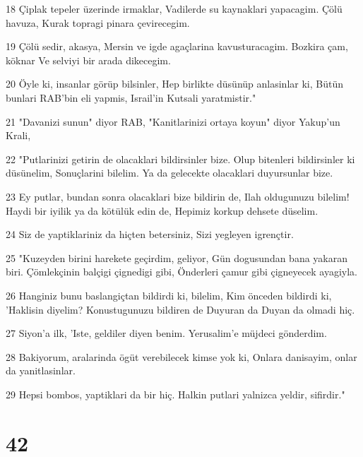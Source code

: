 \par 18 Çiplak tepeler üzerinde irmaklar, Vadilerde su kaynaklari yapacagim. Çölü havuza, Kurak topragi pinara çevirecegim.
\par 19 Çölü sedir, akasya, Mersin ve igde agaçlarina kavusturacagim. Bozkira çam, köknar Ve selviyi bir arada dikecegim.
\par 20 Öyle ki, insanlar görüp bilsinler, Hep birlikte düsünüp anlasinlar ki, Bütün bunlari RAB'bin eli yapmis, Israil'in Kutsali yaratmistir."
\par 21 "Davanizi sunun" diyor RAB, "Kanitlarinizi ortaya koyun" diyor Yakup'un Krali,
\par 22 "Putlarinizi getirin de olacaklari bildirsinler bize. Olup bitenleri bildirsinler ki düsünelim, Sonuçlarini bilelim. Ya da gelecekte olacaklari duyursunlar bize.
\par 23 Ey putlar, bundan sonra olacaklari bize bildirin de, Ilah oldugunuzu bilelim! Haydi bir iyilik ya da kötülük edin de, Hepimiz korkup dehsete düselim.
\par 24 Siz de yaptiklariniz da hiçten betersiniz, Sizi yegleyen igrençtir.
\par 25 "Kuzeyden birini harekete geçirdim, geliyor, Gün dogusundan bana yakaran biri. Çömlekçinin balçigi çignedigi gibi, Önderleri çamur gibi çigneyecek ayagiyla.
\par 26 Hanginiz bunu baslangiçtan bildirdi ki, bilelim, Kim önceden bildirdi ki, 'Haklisin diyelim? Konustugunuzu bildiren de Duyuran da Duyan da olmadi hiç.
\par 27 Siyon'a ilk, 'Iste, geldiler diyen benim. Yerusalim'e müjdeci gönderdim.
\par 28 Bakiyorum, aralarinda ögüt verebilecek kimse yok ki, Onlara danisayim, onlar da yanitlasinlar.
\par 29 Hepsi bombos, yaptiklari da bir hiç. Halkin putlari yalnizca yeldir, sifirdir."

\chapter{42}

